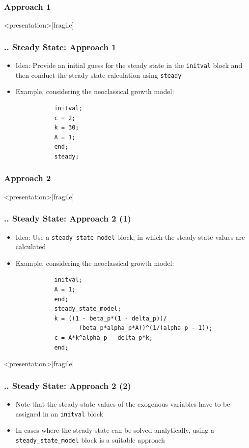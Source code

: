 \documentclass[11pt,aspectratio=169]{beamer}
\begin{document}
\subsubsection{Approach 1}
\begin{frame}<presentation>[fragile]
	\frametitle{{\thesection.\thesubsection.\thesubsubsection} Steady State: Approach 1}
	\begin{itemize}
		\item Idea: Provide an initial guess for the steady state in the \texttt{initval} block and then conduct the steady state calculation using \texttt{steady}
		\item Example, considering the neoclassical growth model:
		\begin{verbatim}
		   initval;
		   c = 2;
		   k = 30;
		   A = 1;
		   end;
		   steady;
		\end{verbatim}
	\end{itemize}
\end{frame}
\subsubsection{Approach 2}
\begin{frame}<presentation>[fragile]
	\frametitle{{\thesection.\thesubsection.\thesubsubsection} Steady State: Approach 2 (1)}
	\begin{itemize}
		\item Idea: Use a \texttt{steady\_state\_model} block, in which the steady state values are calculated
		\item Example, considering the neoclassical growth model:
		\begin{verbatim}
		   initval;
		   A = 1;
		   end;		
		   steady_state_model;
		   k = ((1 - beta_p*(1 - delta_p))/
		          (beta_p*alpha_p*A))^(1/(alpha_p - 1));
		   c = A*k^alpha_p - delta_p*k;
		   end;
		\end{verbatim}
	\end{itemize}
\end{frame}
\begin{frame}<presentation>[fragile]
	\frametitle{{\thesection.\thesubsection.\thesubsubsection} Steady State: Approach 2 (2)}
	\begin{itemize}
		\item Note that the steady state values of the exogenous variables have to be assigned in an \texttt{initval} block
		\item In cases where the steady state can be solved analytically, using a \texttt{steady\_state\_model} block is a suitable approach
	\end{itemize}
\end{frame}
\end{document}
